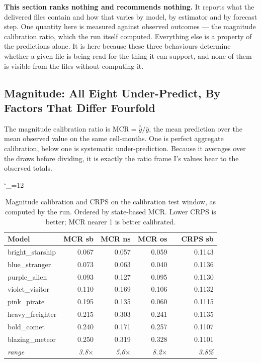 \textbf{This section ranks nothing and recommends nothing.} It reports what the delivered files
contain and how that varies by model, by estimator and by forecast step. One quantity here is
measured against observed outcomes --- the magnitude calibration ratio, which the run itself
computed. Everything else is a property of the predictions alone. It is here because these three
behaviours determine whether a given file is being read for the thing it can support, and none of
them is visible from the files without computing it.

\subsection*{Magnitude: All Eight Under-Predict, By Factors That Differ Fourfold}

The magnitude calibration ratio is $\mathrm{MCR} = \bar{\hat{y}} / \bar{y}$, the mean prediction
over the mean observed value on the same cell-months. One is perfect aggregate calibration, below
one is systematic under-prediction. Because it averages over the draws before dividing, it is
exactly the ratio frame I's values bear to the observed totals.

\begingroup
\catcode`\_=12
\begin{table}[h!]
\centering
\small
\renewcommand{\arraystretch}{1.2}
\caption{Magnitude calibration and CRPS on the calibration test window, as computed by the run.
Ordered by state-based MCR. Lower CRPS is better; MCR nearer 1 is better calibrated.}
\label{tab:magnitude}
\begin{tabular}{@{}p{3.3cm}rrrcr@{}}
\toprule
\textbf{Model} & \textbf{MCR sb} & \textbf{MCR ns} & \textbf{MCR os} & & \textbf{CRPS sb} \\ \midrule
bright_starship  & 0.067 & 0.057 & 0.059 & & 0.1143 \\
blue_stranger    & 0.073 & 0.063 & 0.040 & & 0.1136 \\
purple_alien     & 0.093 & 0.127 & 0.095 & & 0.1130 \\
violet_visitor   & 0.110 & 0.169 & 0.106 & & 0.1132 \\
pink_pirate      & 0.195 & 0.135 & 0.060 & & 0.1115 \\
heavy_freighter  & 0.215 & 0.303 & 0.241 & & 0.1135 \\
bold_comet       & 0.240 & 0.171 & 0.257 & & 0.1107 \\
blazing_meteor   & 0.250 & 0.319 & 0.328 & & 0.1101 \\ \midrule
\textit{range}   & \textit{3.8$\times$} & \textit{5.6$\times$} & \textit{8.2$\times$} & & \textit{3.8\%} \\
\bottomrule
\end{tabular}
\end{table}
\endgroup

